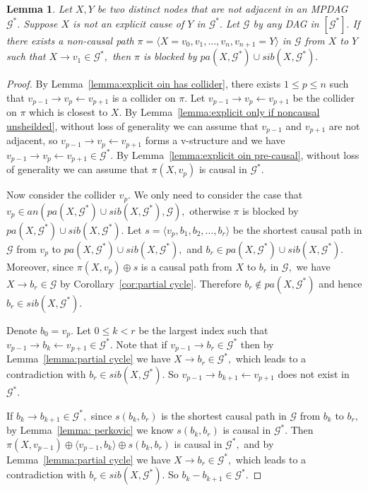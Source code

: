 \documentclass{article}
\newtheorem{lemma}{Lemma}
\begin{document}
\begin{lemma}
\label{lemma:explicit only if noncausal}
Let $X,Y$ be two distinct nodes that are not adjacent in an MPDAG $\mathcal{G}^*.$ Suppose $X$ is not an explicit cause of $Y$ in $\mathcal{G}^*.$ Let $\mathcal{G}$ by any DAG in $[\mathcal{G}^*].$ If there exists a non-causal path $\pi=\langle X=v_0,v_1,\dots,v_n,v_{n+1}=Y\rangle$ in $\mathcal{G}$ from $X$ to $Y$ such that $X\to v_1\in \mathcal{G}^*,$ then $\pi$ is blocked by $pa(X,\mathcal{G}^*)\cup sib(X,\mathcal{G}^*).$ 
\end{lemma}
\begin{proof}
By Lemma~\ref{lemma:explicit oin has collider}, there exists $1\le p \le n$ such that $v_{p-1}\to v_p\leftarrow v_{p+1}$ is a collider on $\pi.$ Let $v_{p-1}\to v_p\leftarrow v_{p+1}$ be the collider on $\pi$ which is closest to $X.$ By Lemma~\ref{lemma:explicit only if noncausal unsheilded}, without loss of generality we can assume that $v_{p-1}$ and $v_{p+1}$ are not adjacent, so $v_{p-1}\to v_p\leftarrow v_{p+1}$ forms a v-structure and we have $v_{p-1}\to v_p\leftarrow v_{p+1}\in \mathcal{G}^*.$ By Lemma~\ref{lemma:explicit oin pre-causal}, without loss of generality we can assume that $\pi(X,v_p)$ is causal in $\mathcal{G}^*.$

Now consider the collider $v_p.$ We only need to consider the case that $v_p\in an(pa(X,\mathcal{G}^*)\cup sib(X,\mathcal{G}^*), \mathcal{G}),$ otherwise $\pi$ is blocked by $pa(X,\mathcal{G}^*)\cup sib(X,\mathcal{G}^*)$. Let $s=\langle v_p,b_1,b_2,\dots,b_r\rangle$ be the shortest causal path in $\mathcal{G}$ from $v_p$ to $pa(X,\mathcal{G}^*)\cup sib(X,\mathcal{G}^*),$ and $b_r\in pa(X,\mathcal{G}^*)\cup sib(X,\mathcal{G}^*).$ Moreover, since $\pi(X,v_p)\oplus s$ is a causal path from $X$ to $b_r$ in $\mathcal{G},$ we have $X\to b_r\in  \mathcal{G}$ by Corollary~\ref{cor:partial cycle}. Therefore $b_r\not\in pa(X,\mathcal{G}^*)$ and hence $b_r\in sib(X,\mathcal{G}^*).$

Denote $b_0=v_p.$ Let $0\le k< r$ be the largest index such that $v_{p-1}\to b_k\leftarrow v_{p+1}\in \mathcal{G}^*.$ Note that if $v_{p-1}\to b_r\in \mathcal{G}^*$ then by Lemma~\ref{lemma:partial cycle} we have $X\to b_r\in \mathcal{G}^*,$ which leads to a contradiction with $b_r\in sib(X,\mathcal{G}^*).$ So $v_{p-1}\to b_{k+1}\leftarrow v_{p+1}$ does not exist in $\mathcal{G}^*.$ 

If $b_k\to b_{k+1}\in \mathcal{G}^*,$ since $s(b_k,b_r)$ is the shortest causal path in $\mathcal{G}$ from $b_k$ to $b_r,$ by Lemma~\ref{lemma: perkovic} we know $s(b_k,b_r)$ is causal in $\mathcal{G}^*.$ Then $\pi(X,v_{p-1})\oplus \langle v_{p-1},b_k\rangle \oplus s(b_k,b_r)$ is causal in $\mathcal{G}^*,$ and by Lemma~\ref{lemma:partial cycle} we have $X\to b_r\in \mathcal{G}^*,$ which leads to a contradiction with $b_r\in sib(X,\mathcal{G}^*).$ So $b_k-b_{k+1}\in \mathcal{G}^*.$


\end{proof}
\end{document}

